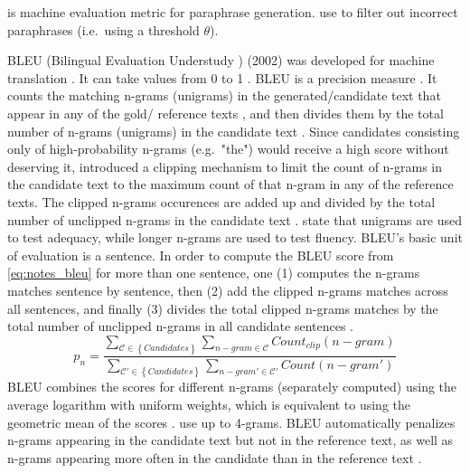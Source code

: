 \bluert{} is machine evaluation metric for paraphrase generation.
\citet{fu_learning_2024} use \bluert{} to filter out incorrect paraphrases (i.e.\ using a threshold $\theta$).

BLEU (Bilingual Evaluation Understudy \citep{palivela_optimization_2021,zhou_paraphrase_2025,papineni_bleu_2001}) (2002) 
was developed for machine translation \citep{zhou_paraphrase_2021,papineni_bleu_2001}.
It can take values from 0 to 1 \citep{papineni_bleu_2001}.
BLEU is a precision measure \citep{kurt_pehlivanoglu_comparative_2024,papineni_bleu_2001}.
It counts the matching n-grams (unigrams) in the generated/candidate text that appear in any of the gold/ reference texts \citep{palivela_optimization_2021,papineni_bleu_2001}, 
and then divides them by the total number of n-grams (unigrams) in the candidate text \citep{papineni_bleu_2001}.
Since candidates consisting only of high-probability n-grams (e.g.\ "the") would receive a high score without deserving it, 
\citet{papineni_bleu_2001} introduced a clipping mechanism to limit the count of n-grams in the candidate text to the maximum count of that n-gram in any of the reference texts.
The clipped n-grams occurences are added up and divided by the total number of unclipped n-grams in the candidate text \citep{papineni_bleu_2001}.
\citet{papineni_bleu_2001} state that unigrams are used to test adequacy, while longer n-grams are used to test fluency.
BLEU's basic unit of evaluation is a sentence. 
In order to compute the BLEU score from \autoref{eq:notes_bleu} for more than one sentence, one (1) computes the n-grams matches sentence by sentence, 
then (2) add the clipped n-grams matches across all sentences, 
and finally (3) divides the total clipped n-grams matches by the total number of unclipped n-grams in all candidate sentences \citep{papineni_bleu_2001}.
\begin{equation}
    p_n = \frac{\sum_{\mathcal{C} \in \left\{ Candidates \right\}}\sum_{n-gram \in\mathcal{C}}Count_{clip}(n-gram)}{\sum_{\mathcal{C'} \in \left\{ Candidates \right\}}\sum_{n-gram' \in\mathcal{C'}}Count(n-gram')}
\label{eq:notes_bleu}
\end{equation}
BLEU combines the scores for different n-grams (separately computed) using the average logarithm with uniform weights, 
which is equivalent to using the geometric mean of the scores \citep{papineni_bleu_2001,banerjee_METEOR_2005}.
\citet{gohsen_captions_2023} use up to 4-grams.
BLEU automatically penalizes n-grams appearing in the candidate text but not in the reference text, as well as n-grams appearing more often in the candidate than in the reference text \citep{papineni_bleu_2001}.
